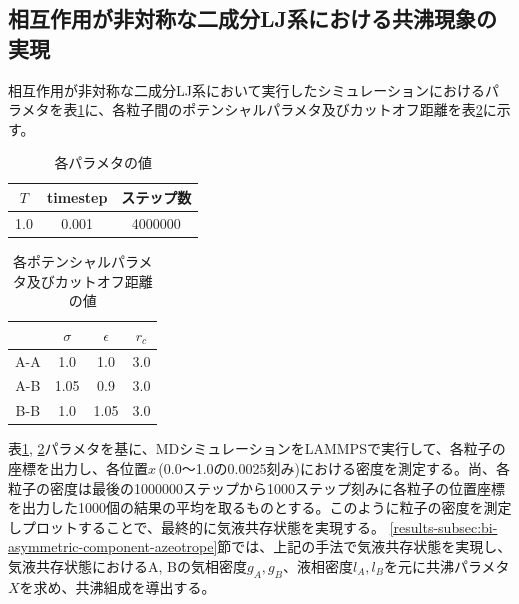 \documentclass[titlepage]{jsreport}
\begin{document}
\subsection{相互作用が非対称な二成分LJ系における共沸現象の実現} \label{method-subsec:bi-asymmetric-component-azeotrope}
相互作用が非対称な二成分LJ系において実行したシミュレーションにおけるパラメタを表\ref{table:asymmetric-bi-component-azeotrope-parameter}に、各粒子間のポテンシャルパラメタ及びカットオフ距離を表\ref{table:asymmetric-bi-component-azeotrope-potential-parameter}に示す。

\begin{table}[htbp]
    \begin{center}
        \caption{各パラメタの値}
        \label{table:asymmetric-bi-component-azeotrope-parameter}
            \begin{tabular}{c c c}
                $T$ & timestep & ステップ数 \\
                \hline
                1.0 & 0.001 & 4000000 \\
            \end{tabular}
    \end{center}
\end{table}

\begin{table}[htbp]
    \begin{center}
        \caption{各ポテンシャルパラメタ及びカットオフ距離の値}
        \label{table:asymmetric-bi-component-azeotrope-potential-parameter}
            \begin{tabular}{c c c c}
                & $\sigma$ & $\epsilon$ & $r_c$ \\
                \hline
                A-A & 1.0 & 1.0 & 3.0 \\
                A-B & 1.05 & 0.9 & 3.0 \\
                B-B & 1.0 & 1.05 & 3.0
            \end{tabular}
    \end{center}
\end{table}

表\ref{table:asymmetric-bi-component-azeotrope-parameter}, \ref{table:asymmetric-bi-component-azeotrope-potential-parameter}パラメタを基に、MDシミュレーションをLAMMPSで実行して、各粒子の座標を出力し、各位置$x$\,(0.0〜1.0の0.0025刻み)における密度を測定する。尚、各粒子の密度は最後の1000000ステップから1000ステップ刻みに各粒子の位置座標を出力した1000個の結果の平均を取るものとする。このように粒子の密度を測定しプロットすることで、最終的に気液共存状態を実現する。
\ref{results-subsec:bi-asymmetric-component-azeotrope}節では、上記の手法で気液共存状態を実現し、気液共存状態におけるA, Bの気相密度$g_A, g_B$、液相密度$l_A, l_B$を元に共沸パラメタ$X$を求め、共沸組成を導出する。
\end{document}
